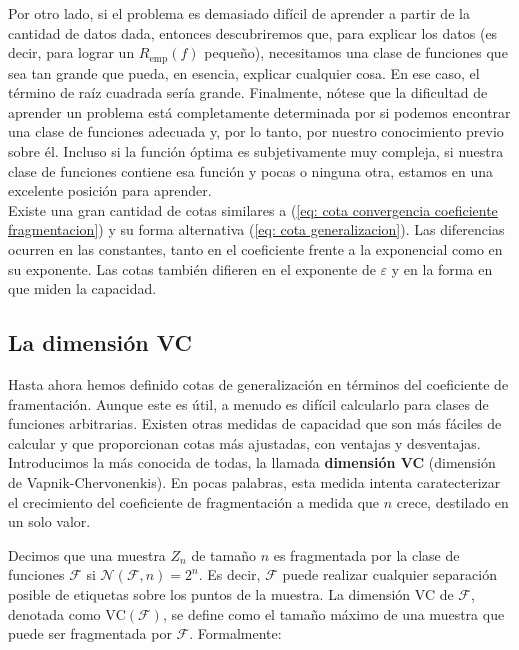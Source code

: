 \documentclass{report}
\begin{document}
Por otro lado, si el problema es demasiado difícil de aprender a partir de la cantidad de datos dada, entonces 
descubriremos que, para explicar los datos (es decir, para lograr un \(R_{\text{emp}}(f)\) pequeño), necesitamos 
una clase de funciones que sea tan grande que pueda, en esencia, explicar cualquier cosa. En ese caso, el término 
de raíz cuadrada sería grande. Finalmente, nótese que la dificultad de aprender un problema está completamente 
determinada por si podemos encontrar una clase de funciones adecuada y, por lo tanto, por nuestro conocimiento 
previo sobre él. Incluso si la función óptima es subjetivamente muy compleja, si nuestra clase de funciones 
contiene esa función y pocas o ninguna otra, estamos en una excelente posición para aprender.\\

Existe una gran cantidad de cotas similares a (\ref{eq: cota convergencia coeficiente fragmentacion}) 
y su forma alternativa (\ref{eq: cota generalizacion}). Las diferencias ocurren en 
las constantes, tanto en el coeficiente frente a la exponencial como en su exponente. Las cotas también 
difieren en el exponente de \(\varepsilon\) y en la forma en que miden la capacidad.\newline

\subsection{La dimensión VC}

Hasta ahora hemos definido cotas de generalización en términos del coeficiente de framentación.
Aunque este es útil, a menudo es difícil calcularlo para clases de funciones arbitrarias. Existen otras medidas de capacidad
que son más fáciles de calcular y que proporcionan cotas más ajustadas, con ventajas y desventajas.
Introducimos la más conocida de todas, la llamada \textbf{dimensión VC} (dimensión de Vapnik-Chervonenkis). En pocas palabras,
esta medida intenta caratecterizar el crecimiento del coeficiente de fragmentación a medida que $n$ crece, destilado en un 
solo valor.\newline

Decimos que una muestra \(Z_n\) de tamaño \(n\) es fragmentada por la clase de funciones 
\(\mathcal{F}\) si \(\mathcal{N}(\mathcal{F}, n) = 2^n\). Es decir, \(\mathcal{F}\) puede realizar cualquier separación posible de etiquetas sobre 
los puntos de la muestra. La dimensión VC de \(\mathcal{F}\), denotada como \(\text{VC}(\mathcal{F})\), se define como el tamaño 
máximo de una muestra que puede ser fragmentada por \(\mathcal{F}\). Formalmente:\newline
\end{document}
